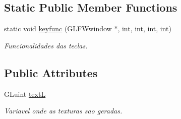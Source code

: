 \subsection*{Static Public Member Functions}
\begin{DoxyCompactItemize}
\item 
static void \mbox{\hyperlink{class_scene_texture_a24b162999ad97cbaec810c4257405e97}{keyfunc}} (G\+L\+F\+Wwindow $\ast$, int, int, int, int)
\begin{DoxyCompactList}\small\item\em Funcionalidades das teclas. \end{DoxyCompactList}\end{DoxyCompactItemize}
\subsection*{Public Attributes}
\begin{DoxyCompactItemize}
\item 
G\+Luint \mbox{\hyperlink{class_scene_texture_a124827d3cc1d79b98ee664b8126b2794}{textL}}
\begin{DoxyCompactList}\small\item\em Variavel onde as texturas sao geradas. \end{DoxyCompactList}\end{DoxyCompactItemize}
